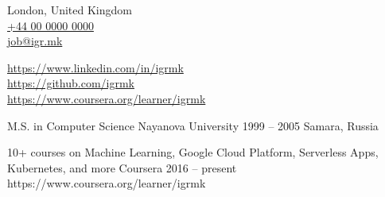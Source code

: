 \documentclass[9pt,a4paper]{juicv}
\makeatletter
\newcommand{\myphone}{\href{tel:+440000000000}{+44 00 0000 0000}}
\newcommand{\myemail}{\href{mailto:job@igr.mk}{job@igr.mk}}
\makeatother
\begin{document}
\begin{paracol}{2}
\newpage
\switchcolumn
\raggedright

    London, United Kingdom\\
    \myphone\\
    \myemail

    \vspace{6pt}
    {
        \small
        \href{https://www.linkedin.com/in/igrmk}{https://www.linkedin.com/in/igrmk}\\
        \href{https://github.com/igrmk}{https://github.com/igrmk}\\
        \href{https://www.coursera.org/learner/igrmk}{https://www.coursera.org/learner/igrmk}
        \par
    }


    \vspace{6pt}
    {
        \cvTag{\LaTeX}
    }

    \cvRightEventNoBody
        {M.S. in Computer Science}
        {Nayanova University}
        {1999 -- 2005}
        {Samara, Russia}
        {}

    \cvRightEventNoBody
        {10+ courses on Machine Learning, Google Cloud Platform, Serverless Apps, Kubernetes, and more}
        {Coursera}
        {2016 -- present}
        {}
        {https://www.coursera.org/learner/igrmk}

\end{paracol}
\end{document}
